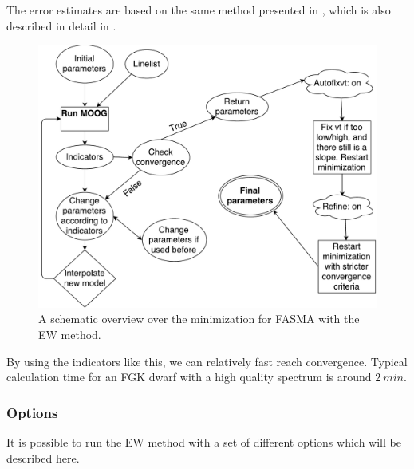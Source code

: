 \documentclass{aa}
\begin{document}
The error estimates are based on the same method presented in
\citet{Gonzalez2000}, which is also described in detail in
\citet{Santos2003,Andreasen2016}.

\begin{figure}[tpb]
    \centering
    \includegraphics[width=1.0\linewidth,natwidth=700,natheight=650]{figures/FASMA_minimization.pdf}
    \caption{A schematic overview over the minimization for FASMA with the
    EW method.}
    \label{fig:FASMA_minimization}
\end{figure}

By using the indicators like this, we can relatively fast reach convergence.
Typical calculation time for an FGK dwarf with a high quality spectrum is around
$\SI{2}{min}$.

\subsubsection{Options}
\label{subs:EWoptions}
It is possible to run the EW method with a set of different options which
will be described here.
\end{document}
